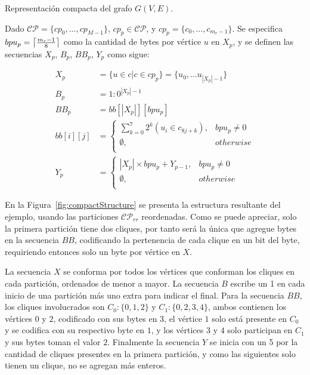 \begin{definition} 
	\label{def:sequences}
	Representación compacta del grafo $G(V, E)$. 
	
	Dado $\mathcal{C}\mathcal{P} = \{cp_{0},...,cp_{M-1}\}$, $cp_{p} \in \mathcal{C}\mathcal{P}$, y $cp_{p}=\{c_{0},...,c_{m_{r}-1}\}$. 
	Se especifica $bpu_{p} = \ceil*{\frac{m_{r}-1}{8}}$ como la cantidad de bytes por vértice $u$ en $X_{p}$, y se definen las secuencias $X_{p}$, $B_{p}$, $BB_{p}$, $Y_{p}$ como sigue:
	
	\begin{align}
		X_{p} &= \{u \in c|c \in cp_{p}\} = \{u_{0},...u_{|X_{p}|-1}\} \\
		B_{p} &= 1:0^{|X_{p}|-1} \\
		BB_{p} &= bb[|X_{p}|][bpu_{p}]   \label{eq:bbp} \\
		bb[i][j] &= \begin{cases}
                  \sum_{k=0}^{7} 2^{k}(u_{i} \in c_{8j+k}), & bpu_{p} \neq 0  \\
                  \emptyset, & otherwise \\
                 \end{cases} \nonumber \\
		Y_{p} &= \begin{cases}
				|X_{p}|\times bpu_{p} + Y_{p-1}, & bpu_{p} \neq 0  \\
				 \emptyset, & otherwise \\
			\end{cases}
	\end{align}
\end{definition}

En la Figura~\ref{fig:compactStructure} se presenta la estructura resultante del ejemplo, usando las particiones $\mathcal{C}\mathcal{P}_{rr}$ reordenadas. Como se puede apreciar, solo la primera partición tiene dos cliques, por tanto será la única que agregue bytes en la secuencia $BB$, codificando la pertenencia de cada clique en un bit del byte, requiriendo entonces solo un byte por vértice en $X$.

La secuencia $X$ se conforma por todos los vértices que conforman los cliques en cada partición, ordenados de menor a mayor. La secuencia $B$ escribe un 1 en cada inicio de una partición más uno extra para indicar el final. Para la secuencia $BB$, los cliques involucrados son $C_{0}: \{0, 1, 2\}$ y $C_{1}: \{0, 2, 3, 4\}$, ambos contienen los vértices $0$ y $2$, codificado con sus bytes en $3$, el vértice $1$ solo está presente en $C_{0}$ y se codifica con su respectivo byte en $1$, y los vértices $3$ y $4$ solo participan en $C_{1}$ y sus bytes toman el valor $2$. Finalmente la secuencia $Y$ se inicia con un  5 por la cantidad de cliques presentes en la primera partición, y como las siguientes solo tienen un clique, no se agregan más enteros.

